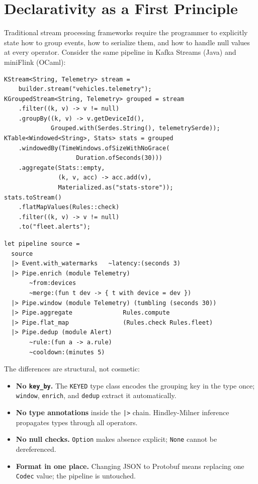 \documentclass[11pt,a4paper]{article}
\begin{document}
\section{Declarativity as a First Principle}

Traditional stream processing frameworks require the programmer to
explicitly state how to group events, how to serialize them, and how to
handle null values at every operator. Consider the same pipeline in
Kafka Streams (Java) and miniFlink (OCaml):

\begin{lstlisting}[caption={Kafka Streams (Java) — imperative},label={lst:kafka}]
KStream<String, Telemetry> stream =
    builder.stream("vehicles.telemetry");
KGroupedStream<String, Telemetry> grouped = stream
    .filter((k, v) -> v != null)
    .groupBy((k, v) -> v.getDeviceId(),
             Grouped.with(Serdes.String(), telemetrySerde));
KTable<Windowed<String>, Stats> stats = grouped
    .windowedBy(TimeWindows.ofSizeWithNoGrace(
                    Duration.ofSeconds(30)))
    .aggregate(Stats::empty,
               (k, v, acc) -> acc.add(v),
               Materialized.as("stats-store"));
stats.toStream()
    .flatMapValues(Rules::check)
    .filter((k, v) -> v != null)
    .to("fleet.alerts");
\end{lstlisting}

\begin{lstlisting}[caption={miniFlink (OCaml) — declarative},label={lst:mf}]
let pipeline source =
  source
  |> Event.with_watermarks   ~latency:(seconds 3)
  |> Pipe.enrich (module Telemetry)
       ~from:devices
       ~merge:(fun t dev -> { t with device = dev })
  |> Pipe.window (module Telemetry) (tumbling (seconds 30))
  |> Pipe.aggregate              Rules.compute
  |> Pipe.flat_map               (Rules.check Rules.fleet)
  |> Pipe.dedup (module Alert)
       ~rule:(fun a -> a.rule)
       ~cooldown:(minutes 5)
\end{lstlisting}

The differences are structural, not cosmetic:

\begin{itemize}
\item \textbf{No \texttt{key\_by}.} The \texttt{KEYED} type class encodes
  the grouping key in the type once; \texttt{window}, \texttt{enrich},
  and \texttt{dedup} extract it automatically.
\item \textbf{No type annotations} inside the \texttt{|>} chain.
  Hindley-Milner inference propagates types through all operators.
\item \textbf{No null checks.} \texttt{Option} makes absence explicit;
  \texttt{None} cannot be dereferenced.
\item \textbf{Format in one place.} Changing JSON to Protobuf means
  replacing one \texttt{Codec} value; the pipeline is untouched.
\end{itemize}
\end{document}
